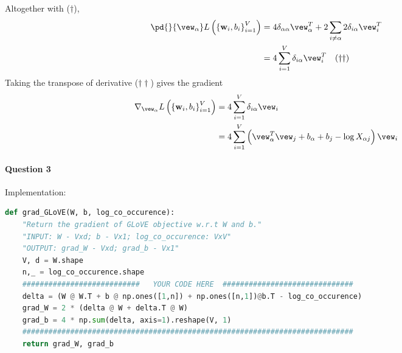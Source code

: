 \documentclass{article}
\begin{document}
    Altogether with ($\dagger$),
    \begin{align}
    	\pd{}{\vew_\alpha} L\left(\left\{\mathbf{w}_{i}, b_{i}\right\}_{i=1}^{V}\right)
    	&= 4 \delta_{\alpha \alpha} \vew_\alpha^T + 2 \sum_{i \neq \alpha} 2 \delta_{i \alpha} \vew_i^T \\
    	&= 4 \sum_{i=1}^V \delta_{i\alpha} \vew_i^T \quad(\dagger \dagger)
    \end{align}
    Taking the transpose of derivative ($\dagger\dagger$) gives the gradient
    \begin{align}
    	\nabla_{\vew_\alpha} L\left(\left\{\mathbf{w}_{i}, b_{i}\right\}_{i=1}^{V}\right)
    	&= 4 \sum_{i=1}^V \delta_{i\alpha} \vew_i \\
    	&= 4 \sum_{i=1}^V \left(\vew_\alpha^T \vew_j + b_\alpha + b_j - \log X_{\alpha j} \right) \vew_i 
    \end{align}

    \paragraph{Question 3} Implementation: 
    \begin{lstlisting}[language=python]
def grad_GLoVE(W, b, log_co_occurence):
    "Return the gradient of GLoVE objective w.r.t W and b."
    "INPUT: W - Vxd; b - Vx1; log_co_occurence: VxV"
    "OUTPUT: grad_W - Vxd; grad_b - Vx1"
    V, d = W.shape
    n,_ = log_co_occurence.shape
    ###########################   YOUR CODE HERE  ##############################
    delta = (W @ W.T + b @ np.ones([1,n]) + np.ones([n,1])@b.T - log_co_occurence)
    grad_W = 2 * (delta @ W + delta.T @ W)
    grad_b = 4 * np.sum(delta, axis=1).reshape(V, 1)
	############################################################################
    return grad_W, grad_b	
    \end{lstlisting}
    
\end{document}
